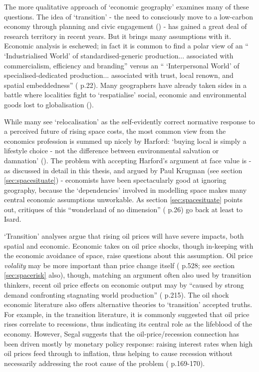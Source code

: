 The more qualitative approach of `economic geography' examines many of these questions. The idea of `transition' - the need to consciously move to a low-carbon economy through planning and civic engagement (\citealt{hopkins_transition_2008}) - has gained a great deal of research territory in recent years. But it brings many assumptions with it. Economic analysis is eschewed; in fact it is common to find a polar view of an `` `Industrialised World' of standardised-generic production... associated with commercialism, efficiency and branding'' versus an `` `Interpersonal World' of specialised-dedicated production... associated with trust, local renown, and spatial embeddedness'' (\citealt{morgan_worlds_2006} p.22). Many geographers have already taken sides in a battle where localities fight to `respatialise' social, economic and environmental goods lost to globalisation (\citealt{glasmeier_book_2007}). 

While many see `relocalisation' as the self-evidently correct normative response to a perceived future of rising space costs, the most common view from the economics profession is summed up nicely by Harford: `buying local is simply a lifestyle choice - not the difference between environmental salvation or damnation' (\citealt{harford_frequent_2007}). The problem with accepting Harford's argument at face value is - as discussed in detail in this thesis, and argued by Paul Krugman (see section \ref{sec:spacesituate}) - economists have been spectacularly good at ignoring geography, because the `dependencies' involved in modelling space makes many central economic assumptions unworkable. As section \ref{sec:spacesituate} points out, critiques of this ``wonderland of no dimension'' (\citealt{isard_location_1956} p.26) go back at least to Isard.

`Transition' analyses argue that rising oil prices will have severe impacts, both spatial and economic. Economic takes on oil price shocks, though in-keeping with the economic avoidance of space, raise questions about this assumption. Oil price \emph{volality} may be more important than price change itself (\citealt{bachmeier_should_2008} p.528; see section \ref{sec:spacerisk} also), though, matching an argument often also used by transition thinkers, recent oil price effects on economic output may by ``caused by strong demand confronting stagnating world production'' (\citealt{hamilton_causes_2009} p.215). The oil shock economic literature also offers alternative theories to `transition' accepted truths. For example, in the transition literature, it is commonly suggested that oil price rises correlate to recessions, thus indicating its central role as the lifeblood of the economy. However, Segal suggests that the oil-price/recession connection has been driven mostly by monetary policy response: raising interest rates when high oil prices feed through to inflation, thus helping to cause recession without necessarily addressing the root cause of the problem (\citealt{segal_oil_2011} p.169-170).

